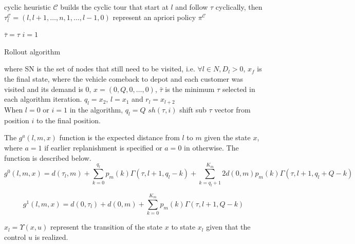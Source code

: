 cyclic heuristic $\mathcal{C}$ builds the cyclic tour that start at $l$ and follow $\tau$ cyclically, then $\tau^\mathcal{C}_l = (l, l+1, \ldots , n , 1 , \ldots , l-1, 0)$ represent an apriori policy $\pi^\mathcal{C}$




\begin{algorithm}
$\bar\tau = \tau$\;
$i=1$\;
\caption{Rollout algorithm}\label{algo:rollout1step}
\end{algorithm}

where SN is the set of nodes that still need to be visited, i.e. $\forall l \in N, D_l > 0$, 
$x_f$ is the final state, where the vehicle comeback to depot and each customer was visited and its demand is $0$, $x=(0,Q,0,\ldots,0)$, $\bar\tau$ is the minimum $\tau$ selected in each algorithm iteration.
$q_l = x_2$, $l=x_1$ and $r_l=x_{l+2}$\\
When $l=0$ or $i=1$ in the algorithm, $q_l = Q$
$sh(\tau,i)$ shift sub $\tau$ vector from position $i$ to the final position. 

The $g^a(l,m,x)$ function is the expected distance from $l$ to $m$ given the state $x$, where $a=1$ if earlier replanishment is specified or $a=0$ in otherwise. The function is described below.
\begin{equation}\label{ra:Cost2Go0}
 g^0(l,m,x)=d(\tau_l,m)+\sum_{k=0}^{q_l}p_m(k)\Gamma(\tau,l+1,q_l-k)+\sum_{k=q_l+1}^{K_m}2d(0,m)p_m(k)\Gamma(\tau,l+1,q_l+Q-k)%
\end{equation}

\begin{equation}\label{ra:Cost2Go1}
 g^1(l,m,x)=d(0,\tau_l)+d(0,m)+\sum_{k=0}^{K_m}p_m(k)\Gamma(\tau,l+1,Q-k)
\end{equation}


$x_l = \Upsilon(x,u)$ represent the transition of the state $x$ to state $x_l$ given that the control $u$ is realized.





